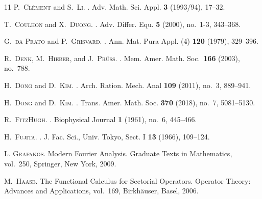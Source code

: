 \documentclass[11pt, leqno]{amsart}
\theoremstyle{definition}
\begin{document}
\begin{thebibliography}{11}
		\textsc{P.~Cl\'ement} and \textsc{S.~Li}.
		.
		\newblock Adv. Math. Sci. Appl. \textbf{3} (1993/94), 17--32.


		\textsc{T.~Coulhon} and \textsc{X.~Duong}.
		.
		\newblock Adv. Differ. Equ. \textbf{5} (2000), no.~1-3, 343--368.

		\textsc{G.~da Prato} and \textsc{P.~Grisvard}.
		.
		\newblock Ann. Mat. Pura Appl. (4) \textbf{120} (1979), 329--396.

		\textsc{R.~Denk}, \textsc{M.~Hieber}, and \textsc{J.~Pr\"uss}.
		.
		\newblock Mem. Amer. Math. Soc.~\textbf{166} (2003), no.~788.


		\textsc{H.~Dong} and \textsc{D.~Kim}.
		.
		\newblock Arch. Ration. Mech. Anal \textbf{109} (2011), no.~3, 889--941.

		\textsc{H.~Dong} and \textsc{D.~Kim}.
		.
		\newblock Trans. Amer. Math. Soc. \textbf{370} (2018), no.~7, 5081--5130.

		\textsc{R.~FitzHugh}.
		.
		\newblock Biophysical Journal \textbf{1} (1961), no.~6, 445--466.


		\textsc{H.~Fujita}.
		.
		\newblock J. Fac. Sci., Univ. Tokyo, Sect. I \textbf{13} (1966), 109--124.

		\textsc{L. Grafakos}.
		\newblock Modern {F}ourier {A}nalysis.
		Graduate Texts in Mathematics, vol.~250,
		\newblock Springer, New York, 2009.

		\textsc{M.~Haase}.
		\newblock The {F}unctional {C}alculus for {S}ectorial {O}perators. Operator Theory: Advances and Applications, vol.~169,
		\newblock Birkh{\"a}user, Basel, 2006.


\end{thebibliography}
\end{document}

